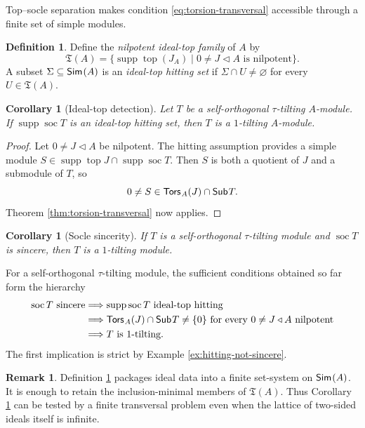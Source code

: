 \documentclass[a4paper,reqno]{amsart}
\newtheorem{corollary}[theorem]{Corollary}
\theoremstyle{definition}
\newtheorem{definition}[theorem]{Definition}
\newtheorem{remark}[theorem]{Remark}
\newcommand{\soc}{\operatorname{soc}\nolimits}
\newcommand{\topm}{\operatorname{top}\nolimits}
\newcommand{\supp}{\operatorname{supp}\nolimits}
\newcommand{\Sub}{\mathsf{Sub}\hspace{.01in}}
\newcommand{\Tors}{\mathsf{Tors}\hspace{.01in}}
\newcommand{\Sim}{\mathsf{Sim}\hspace{.01in}}
\numberwithin{equation}{section}
\begin{document}
Top--socle separation makes condition
\eqref{eq:torsion-transversal} accessible through a finite set of
simple modules.

\begin{definition}\label{def:hitting}
Define the \emph{nilpotent ideal-top family} of $A$ by
\[
 \mathfrak T(A)=
 \bigl\{\supp\topm(J_A)\mid
 0\neq J\triangleleft A\text{ is nilpotent}\bigr\}.
\]
A subset $\Sigma\subseteq\Sim(A)$ is an \emph{ideal-top hitting set}
if $\Sigma\cap U\neq\varnothing$ for every $U\in\mathfrak T(A)$.
\end{definition}

\begin{corollary}[Ideal-top detection]\label{cor:hitting}
Let $T$ be a self-orthogonal $\tau$-tilting $A$-module.  If
$\supp\soc T$ is an ideal-top hitting set, then $T$ is a
$1$-tilting $A$-module.
\end{corollary}

\begin{proof}
Let $0\neq J\triangleleft A$ be nilpotent.  The hitting assumption
provides a simple module
$S\in\supp\topm J\cap\supp\soc T$.  Then $S$ is both a quotient of
$J$ and a submodule of $T$, so
\[
              0\neq S\in\Tors_A(J)\cap\Sub T.
\]
Theorem \ref{thm:torsion-transversal} now applies.
\end{proof}

\begin{corollary}[Socle sincerity]\label{cor:socle-sincere}
If $T$ is a self-orthogonal $\tau$-tilting module and $\soc T$ is
sincere, then $T$ is a $1$-tilting module.
\end{corollary}

For a self-orthogonal $\tau$-tilting module, the sufficient
conditions obtained so far form the hierarchy
\[
\begin{aligned}
 \soc T\text{ sincere}
 &\Longrightarrow \supp\soc T\text{ ideal-top hitting}\\
 &\Longrightarrow
 \Tors_A(J)\cap\Sub T\neq\{0\}
 \text{ for every }0\neq J\triangleleft A\text{ nilpotent}\\
 &\Longrightarrow T\text{ is }1\text{-tilting}.
\end{aligned}
\]
The first implication is strict by Example
\ref{ex:hitting-not-sincere}.

\begin{remark}\label{rem:finite-hitting}
Definition \ref{def:hitting} packages ideal data into a finite
set-system on $\Sim(A)$. It is enough to retain the inclusion-minimal
members of $\mathfrak T(A)$. Thus Corollary \ref{cor:hitting} can be
tested by a finite transversal problem even when the lattice of
two-sided ideals itself is infinite.
\end{remark}
\end{document}

